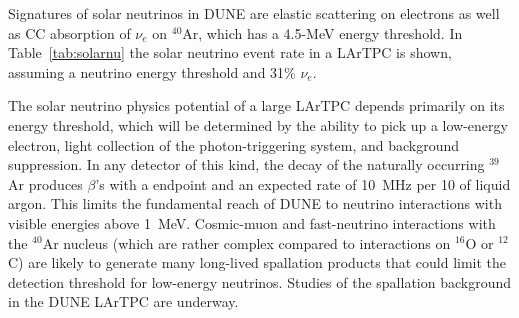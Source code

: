 Signatures of solar neutrinos in DUNE
are elastic scattering on electrons as well as CC absorption of $\nu_e$ on $^{40}$Ar, which has a 4.5-MeV energy threshold.
In Table~\ref{tab:solarnu} the solar neutrino event rate in a
 LArTPC is shown, assuming a  neutrino energy
threshold and 31\% $\nu_e$.
%
\begin{table}[!htb]
\caption[Solar neutrino rates in a LArTPC]{Solar neutrino event rates in a  LArTPC assuming 
a  neutrino energy threshold and 31\% $\nu_e$}
\label{tab:solarnu}
\end{table}


The solar neutrino physics potential of a large LArTPC depends
primarily on its energy threshold, which will 
be determined by the ability to pick up a low-energy electron, light collection of the photon-triggering system,
and background suppression. 
In any
detector of this kind, the decay of the naturally occurring $^{39}$Ar
produces $\beta$'s with a  endpoint and an expected rate
of \SI{10}{\MHz} per \SI{10}{\kt} of liquid argon. This limits the
fundamental reach of DUNE to neutrino interactions with visible
energies above \SI{1}{\MeV}. 
Cosmic-muon and fast-neutrino
interactions with the $^{40}$Ar nucleus (which are rather complex
compared to interactions on $^{16}$O or $^{12}$C) are likely to
generate many long-lived spallation products that could limit the
detection threshold for low-energy neutrinos.
Studies of the spallation background in the DUNE LArTPC are
underway. 


